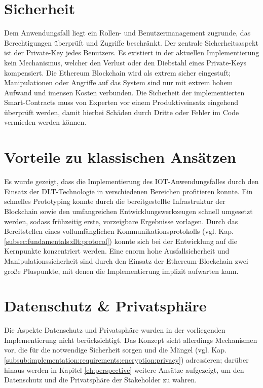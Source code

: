 \section{Sicherheit}
\label{sec:results:Security}
Dem Anwendungsfall liegt ein Rollen- und Benutzermanagement zugrunde, das Berechtigungen überprüft und Zugriffe beschränkt. Der zentrale Sicherheitsaspekt ist der Private-Key jedes Benutzers. Es existiert in der aktuellen Implementierung kein Mechanismus, welcher den Verlust oder den Diebstahl eines Private-Keys kompensiert. Die Ethereum Blockchain wird als extrem sicher eingestuft; Manipulationen oder Angriffe auf das System sind nur mit extrem hohem Aufwand und imensen Kosten verbunden. Die Sicherheit der implementierten Smart-Contracts muss von Experten vor einem Produktiveinsatz eingehend überprüft werden, damit hierbei Schäden durch Dritte oder Fehler im Code vermieden werden können.

\section{Vorteile zu klassischen Ansätzen}
\label{sec:results:advantages}
Es wurde gezeigt, dass die Implementierung des \ac{IOT}-Anwendungsfalles durch den Einsatz der \ac{DLT}-Technologie in verschiedenen Bereichen profitieren konnte. Ein schnelles Prototyping konnte durch die bereitgestellte Infrastruktur der Blockchain sowie den umfangreichen Entwicklungswerkzeugen schnell umgesetzt werden, sodass frühzeitig erste, vorzeigbare Ergebnisse vorlagen. Durch das Bereitstellen eines vollumfänglichen Kommunikationsprotokolls (vgl. Kap. \ref{subsec:fundamentals:dlt:protocol}) konnte sich bei der Entwicklung auf die Kernpunkte konzentriert werden. Eine enorm hohe Ausfallsicherheit und Manipulationssicherheit sind durch den Einsatz der Ethereum-Blockchain zwei große Pluspunkte, mit denen die Implementierung implizit aufwarten kann.

\section{Datenschutz \& Privatsphäre}
\label{sec:results:privacy}
Die Aspekte Datenschutz und Privatsphäre wurden in der vorliegenden Implementierung nicht berücksichtigt. Das Konzept sieht allerdings Mechanismen vor, die für die notwendige Sicherheit sorgen und die Mängel (vgl. Kap. \ref{subsub:implementation:requirements:encryption:privacy}) adressieren; darüber hinaus werden in Kapitel \ref{ch:perspective} weitere Ansätze aufgezeigt, um den Datenschutz und die Privatsphäre der Stakeholder zu wahren.

